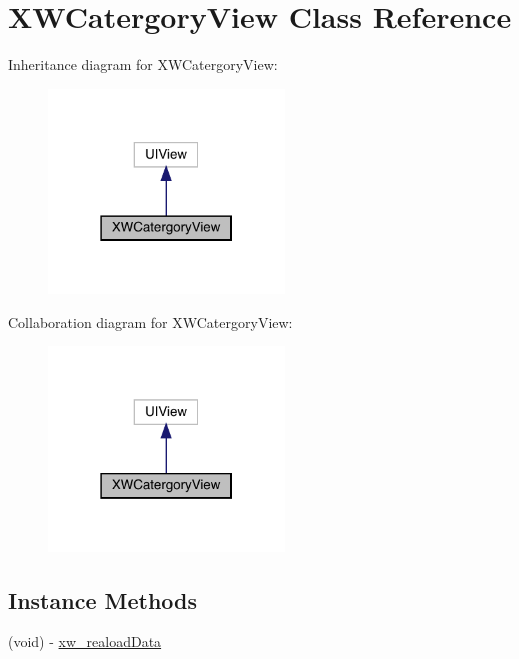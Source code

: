 \hypertarget{interface_x_w_catergory_view}{}\section{X\+W\+Catergory\+View Class Reference}
\label{interface_x_w_catergory_view}


Inheritance diagram for X\+W\+Catergory\+View\+:\nopagebreak
\begin{figure}[H]
\begin{center}
\leavevmode
\includegraphics[width=178pt]{interface_x_w_catergory_view__inherit__graph}
\end{center}
\end{figure}


Collaboration diagram for X\+W\+Catergory\+View\+:\nopagebreak
\begin{figure}[H]
\begin{center}
\leavevmode
\includegraphics[width=178pt]{interface_x_w_catergory_view__coll__graph}
\end{center}
\end{figure}
\subsection*{Instance Methods}
\begin{DoxyCompactItemize}
\item 
(void) -\/ \mbox{\hyperlink{interface_x_w_catergory_view_a09242245705dc5666543cb6fcaf9f6be}{xw\+\_\+reaload\+Data}}
\end{DoxyCompactItemize}
